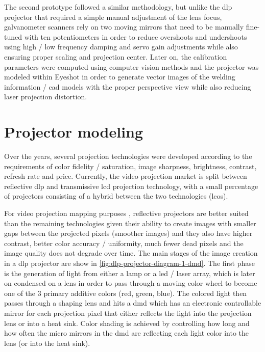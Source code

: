 The second prototype followed a similar methodology, but unlike the \gls{dlp} projector that required a simple manual adjustment of the lens focus, galvanometer scanners rely on two moving mirrors that need to be manually fine-tuned with ten potentiometers in order to reduce overshoots and undershoots using high / low frequency damping and servo gain adjustments while also ensuring proper scaling and projection center. Later on, the calibration parameters were computed using computer vision methods and the projector was modeled within Eyeshot in order to generate vector images of the welding information / \gls{cad} models with the proper perspective view while also reducing laser projection distortion.


\section{Projector modeling}

Over the years, several projection technologies were developed according to the requirements of color fidelity / saturation, image sharpness, brightness, contrast, refresh rate and price. Currently, the video projection market is split between reflective \gls{dlp} and transmissive \gls{lcd} projection technology, with a small percentage of projectors consisting of a hybrid between the two technologies (\gls{lcos}).

For video projection mapping purposes \cite{Bimber2005,Fujimoto2014,Raskar1998,Tan2013}, reflective projectors are better suited than the remaining technologies given their ability to create images with smaller gaps between the projected pixels (smoother images) and they also have higher contrast, better color accuracy / uniformity, much fewer dead pixels and the image quality does not degrade over time. The main stages of the image creation in a \gls{dlp} projector are show in \cref{fig:dlp-projector-diagram-1-dmd}. The first phase is the generation of light from either a lamp or a \gls{led} / laser array, which is later on condensed on a lens in order to pass through a moving color wheel to become one of the 3 primary additive colors (red, green, blue). The colored light then passes through a shaping lens and hits a \gls{dmd} which has an electronic controllable mirror for each projection pixel that either reflects the light into the projection lens or into a heat sink. Color shading is achieved by controlling how long and how often the micro mirrors in the \gls{dmd} are reflecting each light color into the lens (or into the heat sink).

